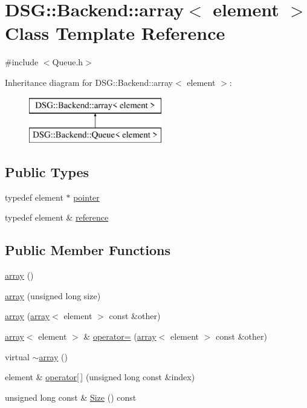 \hypertarget{classDSG_1_1Backend_1_1array}{\section{D\+S\+G\+:\+:Backend\+:\+:array$<$ element $>$ Class Template Reference}
\label{classDSG_1_1Backend_1_1array}
}


{\ttfamily \#include $<$Queue.\+h$>$}

Inheritance diagram for D\+S\+G\+:\+:Backend\+:\+:array$<$ element $>$\+:\begin{figure}[H]
\begin{center}
\leavevmode
\includegraphics[height=2.000000cm]{classDSG_1_1Backend_1_1array}
\end{center}
\end{figure}
\subsection*{Public Types}
\begin{DoxyCompactItemize}
\item 
typedef element $\ast$ \hyperlink{classDSG_1_1Backend_1_1array_abfd0db2267892f4d2f397638faf85ca3}{pointer}
\item 
typedef element \& \hyperlink{classDSG_1_1Backend_1_1array_a8af2a20d445daee75e9e6b122498e0a6}{reference}
\end{DoxyCompactItemize}
\subsection*{Public Member Functions}
\begin{DoxyCompactItemize}
\item 
\hyperlink{classDSG_1_1Backend_1_1array_aa6b9a819e5a82e634956bc7ae3f4f4b2}{array} ()
\item 
\hyperlink{classDSG_1_1Backend_1_1array_aedacabe25ffa6dd6a08cd023a113eb8f}{array} (unsigned long size)
\item 
\hyperlink{classDSG_1_1Backend_1_1array_a07a41d17ec383a4b677b77213873bb6b}{array} (\hyperlink{classDSG_1_1Backend_1_1array}{array}$<$ element $>$ const \&other)
\item 
\hyperlink{classDSG_1_1Backend_1_1array}{array}$<$ element $>$ \& \hyperlink{classDSG_1_1Backend_1_1array_a84b5eb78bf672b58cc6c941d0c0705dd}{operator=} (\hyperlink{classDSG_1_1Backend_1_1array}{array}$<$ element $>$ const \&other)
\item 
virtual \hyperlink{classDSG_1_1Backend_1_1array_ad90859dd72ad8968153211d8c89b24bd}{$\sim$array} ()
\item 
element \& \hyperlink{classDSG_1_1Backend_1_1array_a69fb5ed051dd548a544f4d9ebd94fda7}{operator\mbox{[}$\,$\mbox{]}} (unsigned long const \&index)
\item 
unsigned long const \& \hyperlink{classDSG_1_1Backend_1_1array_ad31900d7cd043f7f058f7d86a36d1748}{Size} () const 
\end{DoxyCompactItemize}

